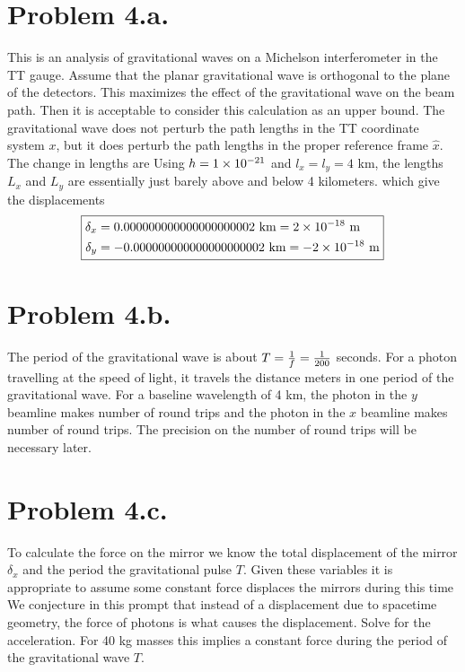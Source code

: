 \documentclass{article}
\begin{document}
\section*{Problem 4.a.}
This is an analysis of gravitational waves on a Michelson interferometer in the TT gauge. Assume that the planar gravitational wave is orthogonal to the plane of the detectors. This maximizes the effect of the gravitational wave on the beam path. Then it is acceptable to consider this calculation as an upper bound. The gravitational wave does not perturb the path lengths in the TT coordinate system $x$, but it does perturb the path lengths in the proper reference frame $\hat{x}$. The change in lengths are
Using $h=1\times 10^{-21}$ and $l_x=l_y=4$ km, the lengths $L_x$ and $L_y$ are essentially just barely above and below 4 kilometers.
which give the displacements
\[ \! \boxed{\begin{aligned}
\delta_x &= 0.000000000000000000002\textrm{ km} = 2\times 10^{-18}\textrm{ m}\\
\delta_y &= -0.000000000000000000002\textrm{ km} = -2\times 10^{-18}\textrm{ m}
\end{aligned}} \]
\section*{Problem 4.b.}
The period of the gravitational wave is about $T=\frac{1}{f}=\frac{1}{200}$ seconds. For a photon travelling at the speed of light, it travels the distance
meters in one period of the gravitational wave. For a baseline wavelength of 4 km, the photon in the $y$ beamline makes
number of round trips and the photon in the $x$ beamline makes
number of round trips. The precision on the number of round trips will be necessary later.
\section*{Problem 4.c.}
To calculate the force on the mirror we know the total displacement of the mirror $\delta_x$ and the period the gravitational pulse $T$. Given these variables it is appropriate to assume some constant force displaces the mirrors during this time
We conjecture in this prompt that instead of a displacement due to spacetime geometry, the force of photons is what causes the displacement. Solve for the acceleration.
For 40 kg masses this implies a constant force
during the period of the gravitational wave $T$.
\end{document}
